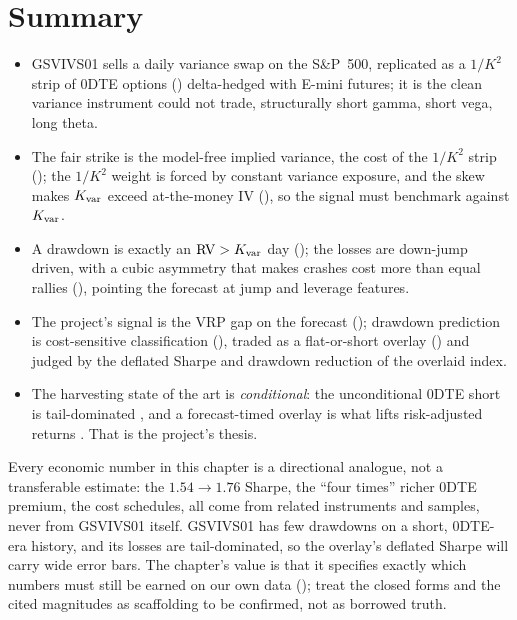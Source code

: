 \section{Summary}
\label{sec:gsvivs:summary}

\begin{keyresult}
\begin{itemize}
  \item GSVIVS01 sells a daily variance swap on the S\&P~500, replicated as a $1/K^2$ strip of 0DTE options () delta-hedged with E-mini futures; it is the clean variance instrument  could not trade, structurally short gamma, short vega, long theta.
  \item The fair strike is the model-free implied variance, the cost of the $1/K^2$ strip (); the $1/K^2$ weight is forced by constant variance exposure, and the skew makes $K_{\mathrm{var}}$ exceed at-the-money IV (), so the signal must benchmark against $K_{\mathrm{var}}$.
  \item A drawdown is exactly an $\operatorname{RV} > K_{\mathrm{var}}$ day (); the losses are down-jump driven, with a cubic asymmetry that makes crashes cost more than equal rallies (), pointing the forecast at jump and leverage features.
  \item The project's signal is the VRP gap on the forecast (); drawdown prediction is cost-sensitive classification (), traded as a flat-or-short overlay () and judged by the deflated Sharpe and drawdown reduction of the overlaid index.
  \item The harvesting state of the art is \emph{conditional}: the unconditional 0DTE short is tail-dominated \citep{Vilkov2024}, and a forecast-timed overlay is what lifts risk-adjusted returns \citep{Yang2024}. That is the project's thesis.
\end{itemize}
\end{keyresult}

\begin{warning}
Every economic number in this chapter is a directional analogue, not a transferable estimate: the $1.54\to1.76$ Sharpe, the ``four times'' richer 0DTE premium, the cost schedules, all come from related instruments and samples, never from GSVIVS01 itself. GSVIVS01 has few drawdowns on a short, 0DTE-era history, and its losses are tail-dominated, so the overlay's deflated Sharpe will carry wide error bars. The chapter's value is that it specifies exactly which numbers must still be earned on our own data (); treat the closed forms and the cited magnitudes as scaffolding to be confirmed, not as borrowed truth.
\end{warning}

